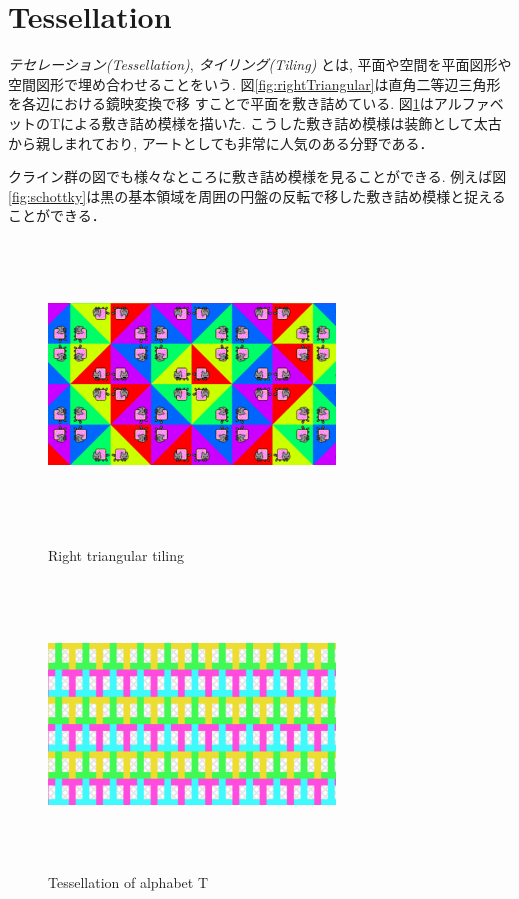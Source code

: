 
\section{Tessellation}

\emph{テセレーション}{\it (Tessellation)}, \emph{タイリング}{\it(Tiling)}
とは, 平面や空間を平面図形や空間図形で埋め合わせることをいう.
図\ref{fig:rightTriangular}は直角二等辺三角形を各辺における鏡映変換で移
すことで平面を敷き詰めている.
図\ref{fig:tessellationT}はアルファベットのTによる敷き詰め模様を描いた.
こうした敷き詰め模様は装飾として太古から親しまれており, アートとしても非常に人気のある分野である．

クライン群の図でも様々なところに敷き詰め模様を見ることができる.
例えば図\ref{fig:schottky}は黒の基本領域を周囲の円盤の反転で移した敷き詰め模様と捉えることができる．

\begin{figure}[h!tbp]
 \begin{minipage}{0.49\hsize}
  \center
  \includegraphics[width=3in, height=3in, keepaspectratio]{../img/tessellation/rightTriangular.pdf}
  \caption{Right triangular tiling}
  \label{fig:rightTriangular}
 \end{minipage}
 \begin{minipage}{0.49\hsize}
  \center
  \includegraphics[width=3in, height=3in, keepaspectratio]{../img/tessellation/tessellationT.pdf}
  \caption{Tessellation of alphabet T}
  \label{fig:tessellationT}
 \end{minipage}
\end{figure}

